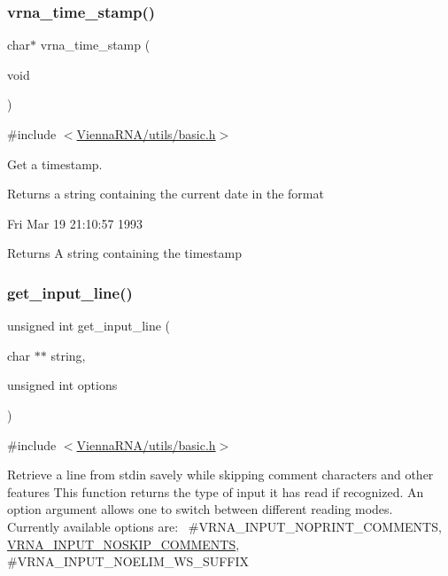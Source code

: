 \subsubsection{\texorpdfstring{vrna\_time\_stamp()}{vrna\_time\_stamp()}}
{\footnotesize\ttfamily char$\ast$ vrna\+\_\+time\+\_\+stamp (\begin{DoxyParamCaption}\item[{void}]{ }\end{DoxyParamCaption})}



{\ttfamily \#include $<$\mbox{\hyperlink{utils_2basic_8h}{Vienna\+R\+N\+A/utils/basic.\+h}}$>$}



Get a timestamp. 

Returns a string containing the current date in the format \begin{DoxyVerb}Fri Mar 19 21:10:57 1993 \end{DoxyVerb}


\begin{DoxyReturn}{Returns}
A string containing the timestamp 
\end{DoxyReturn}
\mbox{\label{group__utils_ga8ef1835eb83f542396f59f0b205965e5}} 
\subsubsection{\texorpdfstring{get\_input\_line()}{get\_input\_line()}}
{\footnotesize\ttfamily unsigned int get\+\_\+input\+\_\+line (\begin{DoxyParamCaption}\item[{char $\ast$$\ast$}]{string,  }\item[{unsigned int}]{options }\end{DoxyParamCaption})}



{\ttfamily \#include $<$\mbox{\hyperlink{utils_2basic_8h}{Vienna\+R\+N\+A/utils/basic.\+h}}$>$}

Retrieve a line from \textquotesingle{}stdin\textquotesingle{} savely while skipping comment characters and other features This function returns the type of input it has read if recognized. An option argument allows one to switch between different reading modes.~\newline
Currently available options are\+:~\newline
\#\+V\+R\+N\+A\+\_\+\+I\+N\+P\+U\+T\+\_\+\+N\+O\+P\+R\+I\+N\+T\+\_\+\+C\+O\+M\+M\+E\+N\+TS, \mbox{\hyperlink{group__utils_ga0f6311f11bed1842e3a527ab27b294c6}{V\+R\+N\+A\+\_\+\+I\+N\+P\+U\+T\+\_\+\+N\+O\+S\+K\+I\+P\+\_\+\+C\+O\+M\+M\+E\+N\+TS}}, \#\+V\+R\+N\+A\+\_\+\+I\+N\+P\+U\+T\+\_\+\+N\+O\+E\+L\+I\+M\+\_\+\+W\+S\+\_\+\+S\+U\+F\+F\+IX

